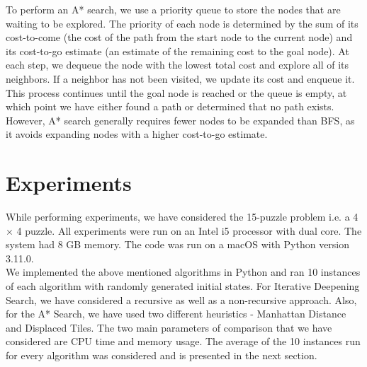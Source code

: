\documentclass[12pt]{article}
\begin{document}
To perform an A* search, we use a priority queue to store the nodes that are waiting to be explored. The priority of each node is determined by the sum of its cost-to-come (the cost of the path from the start node to the current node) and its cost-to-go estimate (an estimate of the remaining cost to the goal node). At each step, we dequeue the node with the lowest total cost and explore all of its neighbors. If a neighbor has not been visited, we update its cost and enqueue it. This process continues until the goal node is reached or the queue is empty, at which point we have either found a path or determined that no path exists. However, A* search generally requires fewer nodes to be expanded than BFS, as it avoids expanding nodes with a higher cost-to-go estimate.

\section{Experiments}
While performing experiments, we have considered the 15-puzzle problem i.e. a 4 $\times$ 4 puzzle. All experiments were run on an Intel i5 processor with dual core. The system had 8 GB memory. The code was run on a macOS with Python version 3.11.0. \\
We implemented the above mentioned algorithms in Python and ran 10 instances of each algorithm with randomly generated initial states. For Iterative Deepening Search, we have considered a recursive as well as a non-recursive approach. Also, for the A* Search, we have used two different heuristics - Manhattan Distance and Displaced Tiles. The two main parameters of comparison that we have considered are CPU time and memory usage. The average of the 10 instances run for every algorithm was considered and is presented in the next section.
\end{document}
